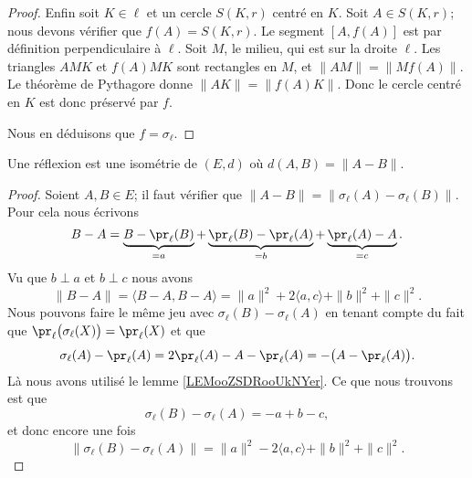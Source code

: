 \begin{proof}
    Enfin soit \( K\in\ell\) et un cercle \( S(K,r)\) centré en \( K\). Soit \( A\in S(K,r)\); nous devons vérifier que \( f(A)=S(K,r)\). Le segment \( [A,f(A)]\) est par définition perpendiculaire à \( \ell\). Soit \( M\), le milieu, qui est sur la droite \( \ell\). Les triangles \( AMK\) et \( f(A)MK\) sont rectangles en \( M\), et \( \| AM \|=\| Mf(A) \|\). Le théorème de Pythagore donne \( \| AK \|=\| f(A)K \|\). Donc le cercle centré en \( K\) est donc préservé par \( f\).

    Nous en déduisons que \( f=\sigma_{\ell}\).
\end{proof}

\begin{proposition}      \label{PROPooFSVEooWmJsnv}
    Une réflexion est une isométrie de \( (E,d)\) où \( d(A,B)=\| A-B \|\).
\end{proposition}

\begin{proof}
    Soient \( A,B\in E\); il faut vérifier que \( \| A-B \|=\| \sigma_{\ell}(A)-\sigma_{\ell}(B) \|\). Pour cela nous écrivons
    \begin{equation}
        B-A=\underbrace{B-\pr_{\ell}(B)}_{=a}+\underbrace{\pr_{\ell}(B)-\pr_{\ell}(A)}_{=b}+\underbrace{\pr_{\ell}(A)-A}_{=c}.
    \end{equation}
    Vu que \( b\perp a\) et \( b\perp c\) nous avons
    \begin{equation}
        \| B-A \|=\langle B-A, B-A\rangle =\| a \|^2+2\langle a, c\rangle +\| b \|^2+\| c \|^2.
    \end{equation}
    Nous pouvons faire le même jeu avec \( \sigma_{\ell}(B)-\sigma_{\ell}(A)\) en tenant compte du fait que \( \pr_{\ell}\big( \sigma_{\ell}(X) \big)=\pr_{\ell}(X)\) et que
    \begin{equation}
        \sigma_{\ell}(A)-\pr_{\ell}(A)=2\pr_{\ell}(A)-A-\pr_{\ell}(A)=-\big( A-\pr_{\ell}(A) \big).
    \end{equation}
    Là nous avons utilisé le lemme \ref{LEMooZSDRooUkNYer}. Ce que nous trouvons est que
    \begin{equation}
        \sigma_{\ell}(B)-\sigma_{\ell}(A)=-a+b-c,
    \end{equation}
    et donc encore une fois 
    \begin{equation}
        \| \sigma_{\ell}(B)-\sigma_{\ell}(A) \|=\| a \|^2-2\langle a, c\rangle +\| b \|^2+\| c \|^2.
    \end{equation}
\end{proof}

